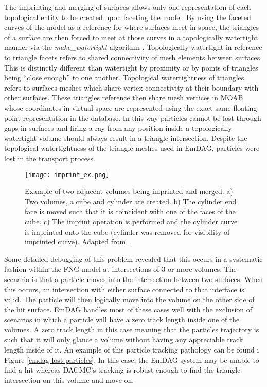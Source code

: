 The imprinting and merging of surfaces allows only one representation of each
topological entity to be created upon faceting the model. By using the faceted
curves of the model as a reference for where surfaces meet in space, the
triangles of a surface are then forced to meet at those curves in a
topologically watertight manner via the \textit{make\_watertight} algorithm
\cite{Smith_2011}. Topologically watertight in reference to triangle facets
refers to shared connectivity of mesh elements between surfaces. This is
distinctly different than watertight by proximity or by points of triangles
being ``close enough'' to one another. Topological watertightness of triangles
refers to surfaces meshes which share vertex connectivity at their boundary with
other surfaces. These triangles reference then share mesh vertices in MOAB whose
coordinates in virtual space are represented using the exact same floating point
representation in the database.  In this way particles cannot be lost through
gaps in surfaces and firing a ray from any position inside a topologically
watertight volume should always result in a triangle intersection. Despite the
topological watertightness of the triangle meshes used in EmDAG, particles were
lost in the transport process.

\begin{figure}[H]
  \centering
  \texttt{[image: imprint\_ex.png]}
  \caption[Graphical depiction of the imprinting process.]{Example of two
    adjacent volumes being imprinted and merged. a) Two volumes, a cube and
    cylinder are created. b) The cylinder end face is moved such that it is
    coincident with one of the faces of the cube. c) The imprint operation is
    performed and the cylinder curve is imprinted onto the cube (cylinder was
    removed for visibility of imprinted curve). Adapted from \cite{White_2002}.}
  \label{imprint_ex}
\end{figure}

Some detailed debugging of this problem revealed that this occurs in a
systematic fashion within the FNG model at intersections of 3 or more
volumes. The scenario is that a particle moves into the intersection between two
surfaces. When this occurs, an intersection with either surface connected to
that interface is valid. The particle will then logically move into the volume
on the other side of the hit surface. EmDAG handles most of these cases well
with the exclusion of scenarios in which a particle will have a zero track
length inside one of the volumes. A zero track length in this case meaning that
the particles trajectory is such that it will only glance a volume without
having any appreciable track length inside of it. An example of this particle
tracking pathology can be found i Figure \ref{emdag-lost-particles}. In this
case, the EmDAG system may be unable to find a hit whereas DAGMC's tracking is
robust enough to find the triangle intersection on this volume and move on.


